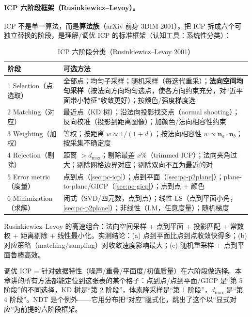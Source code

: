 \paragraph{ICP 六阶段框架（Rusinkiewicz--Levoy）。}
ICP 不是单一算法，而是\textbf{算法族}\cite{rusinkiewicz2001efficient}（arXiv 前身 3DIM 2001）。把 ICP 拆成六个可独立替换的阶段，是理解/调优 ICP 的标准框架（认知工具：系统性分类）：

\begin{table}[H]\centering\small
\caption{ICP 六阶段分类（Rusinkiewicz--Levoy 2001\cite{rusinkiewicz2001efficient}）}
\label{tab:pc-six-stages}
\begin{tabular}{p{} p{}}
\toprule
阶段 & 可选方法 \\
\midrule
1 Selection（点选取） & 全部点；均匀子采样；随机采样（每迭代重采）；\textbf{法向空间均匀采样}（按法向方向均匀选点，使各方向约束充分，对“近平面带小特征”收敛更好）；按颜色/强度梯度选 \\
2 Matching（对应） & 最近点（KD 树）；沿法向投影找交点（normal shooting）；反向校准（投影到距离图像）；加颜色/法向相容性约束 \\
3 Weighting（加权） & 等权；按距离 $w\propto1/(1+d)$；按法向相容性 $w\propto\mathbf{n}_a\cdot\mathbf{n}_b$；按采集不确定度 \\
4 Rejection（剔除） & 距离 $>d_{\max}$；剔除最差 $x\%$（trimmed ICP）；法向夹角过大；剔除网格边界对应；剔除双向不互为最近的对 \\
5 Error metric（度量） & 点到点（\cref{sec:pc-icp}）；点到平面（\cref{sec:pc-p2plane}）；plane-to-plane/GICP（\cref{sec:pc-gicp}）；点到点 + 颜色 \\
6 Minimization（求解） & 闭式（SVD/四元数，点到点）；线性 LS（点到平面小角，\cref{sec:pc-p2plane}）；非线性（LM，任意度量）；随机梯度 \\
\bottomrule
\end{tabular}
\end{table}

\noindent Rusinkiewicz--Levoy 的高速组合：法向空间采样 + 点到平面 + 投影匹配 + 常数权 + 距离剔除 + 线性最小化。实测结论：(a) 点到平面比点到点收敛快得多；(b) 对应策略（matching/sampling）对收敛速度影响最大；(c) 随机重采样 + 点到平面鲁棒高效。

\begin{insight}
调优 ICP = 针对数据特性（噪声/重叠/平面度/初值质量）在六阶段做选择。本章讲的所有方法都能定位到这张表的某个格子：点到点/点到平面/GICP 是“第 5 阶段”的不同选择，KD 树是“第 2 阶段”，体素降采样是“第 1 阶段”，$d_{\max}$ 是“第 4 阶段”。NDT 是个例外——它用分布把“对应”隐式化，跳出了这个以“显式对应”为前提的六阶段框架。
\end{insight}

